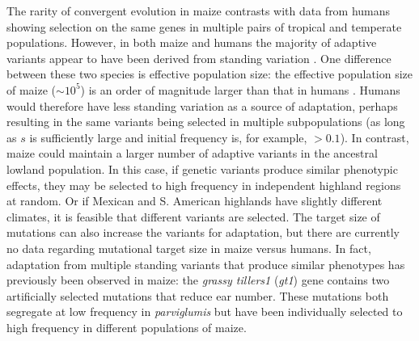 \label{other taxa}
The rarity of convergent evolution in maize contrasts with data from humans \citep{Tennessen_2011_21698142} showing selection on the same genes in multiple pairs of tropical and temperate populations.  
However, in both maize and humans the majority of adaptive variants appear to have been derived from standing variation \cite[]{Tennessen_2011_21698142}.
One difference between these two species is effective population size: the effective population size of maize ($\sim10^5$) is an order of magnitude larger than that in humans \cite[]{Takahata_1997_9114074}.
Humans would therefore have less standing variation as a source of adaptation, perhaps resulting in the same variants being selected in multiple subpopulations (as long as $s$ is sufficiently large and initial frequency is, for example, $>0.1$).
In contrast, maize could maintain a larger number of adaptive variants in the ancestral lowland population.
In this case, if genetic variants produce similar phenotypic effects, they may be selected to high frequency in independent highland regions at random.
Or if Mexican and S. American highlands have slightly different climates, it is feasible that different variants are selected.
The target size of mutations can also increase the variants for adaptation, but there are currently no data regarding mutational target size in maize versus humans.
 
In fact, adaptation from multiple standing variants that produce similar phenotypes has previously been observed in maize: the \emph{grassy tillers1} (\emph{gt1}) gene \cite[]{Wills_2013_23825971} contains two artificially selected mutations that reduce ear number.
These mutations both segregate at low frequency in \emph{parviglumis} but have been individually selected to high frequency in different populations of maize.


